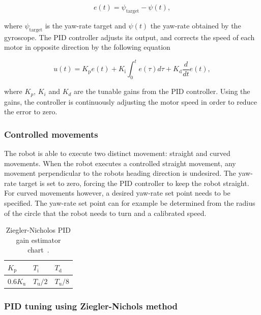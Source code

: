 \begin{equation}
	e(t) = \psi_{\text{target}} - \psi(t),
\end{equation}

\noindent
where $\psi_{\text{target}}$ is the yaw-rate target and $\psi(t)$ the yaw-rate obtained by the gyroscope.
The PID controller adjusts its output, and corrects the speed of each motor in opposite direction by the following equation

\begin{equation}
u(t) = K_{\text{p}}e(t) + K_{\text{i}} \int_{0}^{t}e(\tau)d\tau + K_{\text{d}}\frac{d}{dt}e(t),
\end{equation}

\noindent
where $K_{p}$, $K_{i}$ and $K_{d}$ are the tunable gains from the PID controller.
Using the gains, the controller is continuously adjusting the motor speed in order to reduce the error to zero.

\subsubsection{Controlled movements}

The robot is able to execute two distinct movement: straight and curved movements.
When the robot executes a controlled straight movement, any movement perpendicular to the robots heading direction is undesired.
The yaw-rate target is set to zero, forcing the PID controller to keep the robot straight.
For curved movements however, a desired yaw-rate set point needs to be specified.
The yaw-rate set point can for example be determined from the radius of the circle that the robot needs to turn and a calibrated speed.

\begin{table}[t]
	\centering
	\caption{Ziegler-Nicholos PID gain estimator chart~\cite{franklin_feedback_2015}.}
	\label{tab:gain_chart}
	\begin{tabular}{|l|l|l|} 
		\hline
		$K_{\text{p}}$ & $T_{\text{i}}$ & $T_{\text{d}}$ \\
		\hline \hline
		0.6$K_{\text{u}}$ & $T_{\text{u}}/2$ & $T_{\text{u}}/8$ \\
		\hline
	\end{tabular}
\end{table}

\subsubsection{PID tuning using Ziegler-Nichols method}

